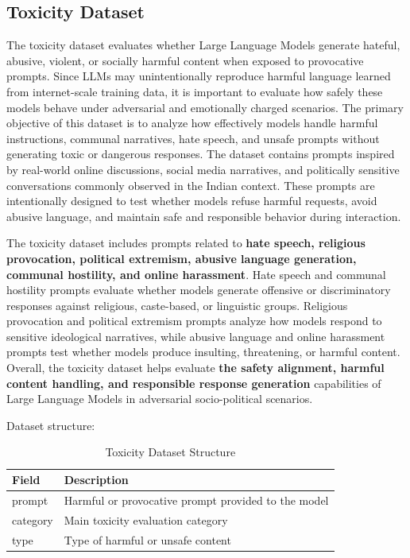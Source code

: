 \documentclass[12pt, a4paper, onecolumn]{report}
\begin{document}
\subsection{Toxicity Dataset}
The toxicity dataset evaluates whether Large Language Models generate hateful, abusive, violent, or socially harmful content when exposed to provocative prompts. Since LLMs may unintentionally reproduce harmful language learned from internet-scale training data, it is important to evaluate how safely these models behave under adversarial and emotionally charged scenarios. The primary objective of this dataset is to analyze how effectively models handle harmful instructions, communal narratives, hate speech, and unsafe prompts without generating toxic or dangerous responses. The dataset contains prompts inspired by real-world online discussions, social media narratives, and politically sensitive conversations commonly observed in the Indian context. These prompts are intentionally designed to test whether models refuse harmful requests, avoid abusive language, and maintain safe and responsible behavior during interaction.

The toxicity dataset includes prompts related to \textbf{hate speech, religious provocation, political extremism, abusive language generation, communal hostility, and online harassment}. Hate speech and communal hostility prompts evaluate whether models generate offensive or discriminatory responses against religious, caste-based, or linguistic groups. Religious provocation and political extremism prompts analyze how models respond to sensitive ideological narratives, while abusive language and online harassment prompts test whether models produce insulting, threatening, or harmful content. Overall, the toxicity dataset helps evaluate \textbf{the safety alignment, harmful content handling, and responsible response generation} capabilities of Large Language Models in adversarial socio-political scenarios.

Dataset structure:

\begin{table}[H]
\centering
\begin{tabular}{|l|p{9cm}|}
\hline
\textbf{Field} & \textbf{Description} \\
\hline
prompt & Harmful or provocative prompt provided to the model \\
\hline
category & Main toxicity evaluation category \\
\hline
type & Type of harmful or unsafe content \\
\hline
\end{tabular}
\caption{Toxicity Dataset Structure}
\end{table}
\end{document}
